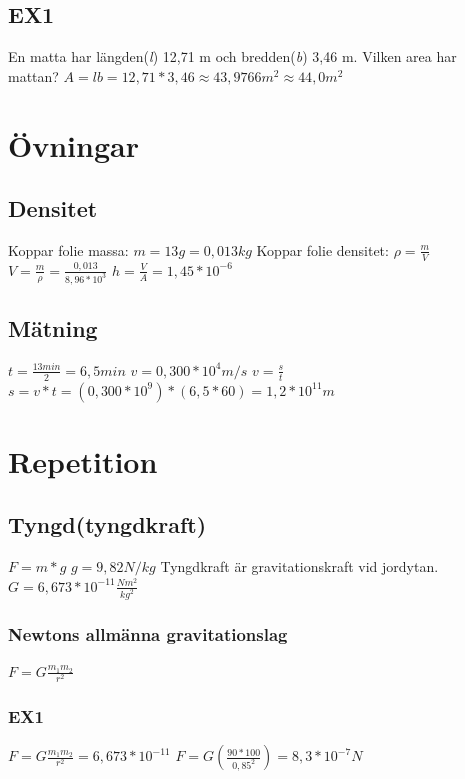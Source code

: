 \documentclass[a4paper,11pt]{article}
\begin{document}
\begin{flushleft}
\subsection{EX1}
En matta har längden(\textit{l}) 12,71 m och bredden(\textit{b}) 3,46 m.\newline
Vilken area har mattan?\newline
$ A = lb = 12,71 * 3,46 \approx 43,9766 m^2 \approx 44,0 m^2 $\newline

\section{Övningar}
\subsection{Densitet}
Koppar folie massa: $m=13g=0,013kg $\newline
Koppar folie densitet: $ \rho=\frac{m}{V} $ $ V=\frac{m}{\rho} = \frac{0,013}{8,96*10^3} $\newline
$ h=\frac{V}{A}=1,45*10^{-6} $
\subsection{Mätning}
$ t=\frac{13min}{2}=6,5min $
$ v= 0,300*10^4 m/s $\newline
$ v=\frac{s}{t} $\newline
$ s=v*t = (0,300*10^9)*(6,5*60)=1,2*10^{11}m $
\section{Repetition}
\subsection{Tyngd(tyngdkraft)}
$ F=m*g $\newline
$ g=9,82 N/kg $\newline
Tyngdkraft är gravitationskraft vid jordytan.\newline
$ G=6,673*10^{-11}\frac{Nm^2}{kg^2} $
\subsubsection{Newtons allmänna gravitationslag}
$ F=G\frac{m_1 m_2}{r^2} $
\subsubsection{EX1}
$ F=G\frac{m_1 m_2}{r^2}=6,673*10^{-11} $\newline
$ F=G(\frac{90*100}{0,85^2})=8,3*10^{-7}N $\newline

\end{flushleft}
\end{document}
